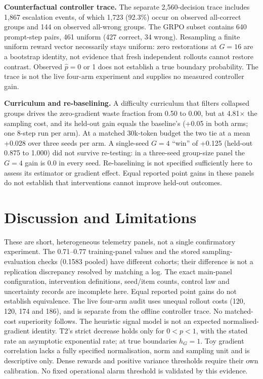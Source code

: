 \textbf{Counterfactual controller trace.} The separate 2,560-decision
trace includes 1,867 escalation events, of which 1,723 (92.3\%) occur on
observed all-correct groups and 144 on observed all-wrong groups. The GRPO
subset contains 640 prompt-step pairs, 461 uniform (427 correct, 34 wrong).
Resampling a finite uniform reward vector necessarily stays uniform: zero
restorations at $G=16$ are a bootstrap identity, not evidence that fresh
independent rollouts cannot restore contrast. Observed $\hat p=0$ or 1 does
not establish a true boundary probability. The trace is not the live
four-arm experiment and supplies no measured controller gain.

\textbf{Curriculum and re-baselining.} A difficulty curriculum that filters
collapsed groups drives the zero-gradient waste fraction from 0.50 to 0.00,
but at 4.81$\times$ the sampling cost, and its held-out gain equals the
baseline's (+0.05 in both arms; one 8-step run per arm). At a matched
30k-token budget the two tie at a mean +0.028 over three seeds per arm. A
single-seed $G=4$ ``win'' of +0.125 (held-out 0.875 to 1.000) did not survive
re-testing: in a three-seed group-size panel the $G=4$ gain is 0.0 in every seed. Re-baselining is not specified sufficiently here to assess its
estimator or gradient effect. Equal reported point gains in these panels
do not establish that interventions cannot improve held-out outcomes.

\section{Discussion and Limitations}
These are short, heterogeneous telemetry panels, not a single confirmatory
experiment. The 0.71--0.77 training-panel values and the stored
sampling-evaluation checks (0.1583 pooled) have different cohorts; their difference is not
a replication discrepancy resolved by matching a log. The exact main-panel
configuration, intervention definitions, seed/item counts, control law and
uncertainty records are incomplete here. Equal reported point gains do not
establish equivalence. The live four-arm audit uses unequal rollout costs
(120, 120, 174 and 186), and is separate from the offline controller trace.
No matched-cost superiority follows. The heuristic signal model is not an
expected normalised-gradient identity. T2's strict decrease holds only for
$0<p<1$, with the stated rate an asymptotic exponential rate; at true
boundaries $h_G=1$. Toy gradient correlation lacks a fully specified
normalisation, norm and sampling unit and is descriptive only. Dense rewards
and positive variance thresholds require their own calibration. No fixed
operational alarm threshold is validated by this evidence.

